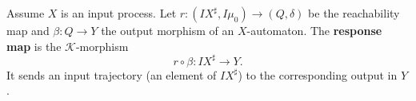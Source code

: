 Assume $X$ is an input process. Let $r: (IX^{\sharp}, I\mu_0) \to (Q, \delta)$ be the reachability map and $\beta: Q \to Y$ the output morphism of an $X$-automaton. The \textbf{response map} is the $\mathcal{K}$-morphism
$$r \circ \beta: IX^{\sharp} \longrightarrow Y.$$
It sends an input trajectory (an element of $IX^{\sharp}$) to the corresponding output in $Y$.
